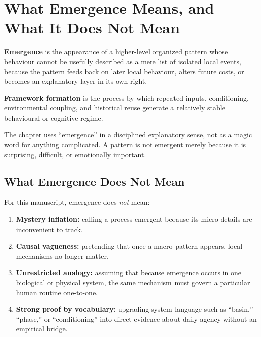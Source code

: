 \section{What Emergence Means, and What It Does Not Mean}

\begin{definition}[Emergence]
\textbf{Emergence} is the appearance of a higher-level organized pattern whose
behaviour cannot be usefully described as a mere list of isolated local events,
because the pattern feeds back on later local behaviour, alters future costs,
or becomes an explanatory layer in its own right.
\end{definition}

\begin{definition}
\textbf{Framework formation} is the process by which repeated inputs,
conditioning, environmental coupling, and historical reuse generate a
relatively stable behavioural or cognitive regime.
\end{definition}

\begin{remark}
The chapter uses ``emergence'' in a disciplined explanatory sense, not as a
magic word for anything complicated. A pattern is not emergent merely because
it is surprising, difficult, or emotionally important.
\end{remark}

\subsection{What Emergence Does Not Mean}

For this manuscript, emergence does \emph{not} mean:
\begin{enumerate}[nosep]
  \item \textbf{Mystery inflation:} calling a process emergent because its
        micro-details are inconvenient to track.
  \item \textbf{Causal vagueness:} pretending that once a macro-pattern
        appears, local mechanisms no longer matter.
  \item \textbf{Unrestricted analogy:} assuming that because emergence occurs
        in one biological or physical system, the same mechanism must govern a
        particular human routine one-to-one.
  \item \textbf{Strong proof by vocabulary:} upgrading system language such as
        ``basin,'' ``phase,'' or ``conditioning'' into direct evidence about
        daily agency without an empirical bridge.
\end{enumerate}

